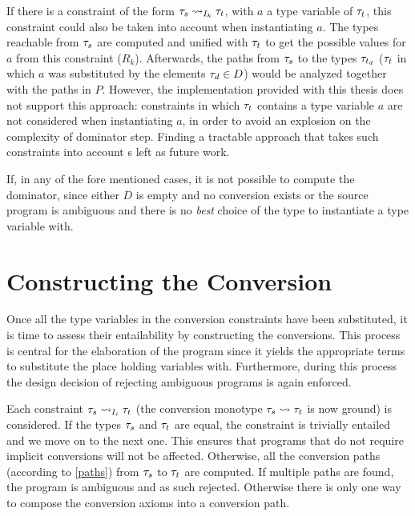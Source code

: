 If there is a constraint of the form $\convX{\imEnv_k}{\type_s}{\type_t}$, with $a$ a type variable of $\type_t$, this constraint could also be taken into account when instantiating $a$. The types reachable from $\type_s$ are computed and unified with $\type_t$ to get the possible values for $a$ from this constraint ($R_k$). Afterwards, the paths from $\type_s$ to the types $\type_{t_d}$ ($\type_t$ in which $a$ was substituted by the elements $\type_d \in D$) would be analyzed together with the paths in $P$. However, the implementation provided with this thesis does not support this approach: constraints in which $\type_t$ contains a type variable $a$ are not considered when instantiating $a$, in order to avoid an explosion on the complexity of dominator step. Finding a tractable approach that takes such constraints into account s left as future work.


If, in any of the fore mentioned cases, it is not possible to compute the dominator, since either $D$ is empty and no conversion exists or the source program is ambiguous and there is no \textit{best} choice of the type to instantiate a type variable with.



\section{Constructing the Conversion}
\label{constructing}
Once all the type variables in the conversion constraints have been substituted, it is time to assess their entailability by constructing the conversions. This process is central for the elaboration of the program since it yields the appropriate terms to substitute the place holding variables with. Furthermore, during this process the design decision of rejecting ambiguous programs is again enforced.

Each constraint $\convX{\imEnv_i}{\type_{s}}{\type_{t}}$ (the conversion monotype $\type_{s}\rightsquigarrow \type_{t}$ is now ground) is considered. If the types $\type_{s}$ and $\type_{t}$ are equal, the constraint is trivially entailed and we move on to the next one. This ensures that programs that do not require implicit conversions will not be affected. Otherwise, all the conversion paths (according to \ref{paths}) from $\type_{s}$ to $\type_{t}$ are computed. If multiple paths are found, the program is ambiguous and as such rejected. Otherwise there is only one way to compose the conversion axioms into a conversion path.


